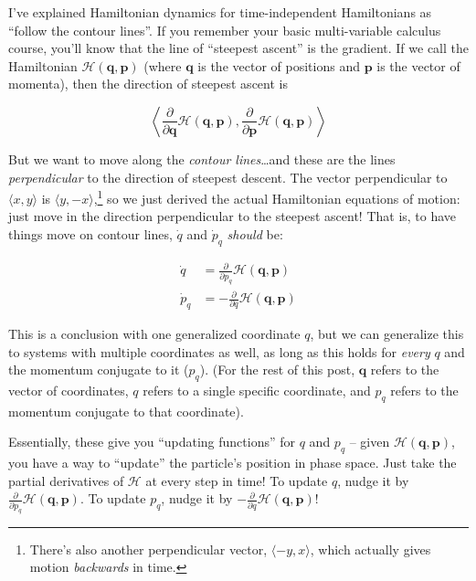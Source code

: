 \documentclass[]{article}
\begin{document}
I've explained Hamiltonian dynamics for time-independent Hamiltonians as
``follow the contour lines''. If you remember your basic multi-variable calculus
course, you'll know that the line of ``steepest ascent'' is the gradient. If we
call the Hamiltonian \(\mathcal{H}(\mathbf{q},\mathbf{p})\) (where
\(\mathbf{q}\) is the vector of positions and \(\mathbf{p}\) is the vector of
momenta), then the direction of steepest ascent is

\[
\left \langle \frac{\partial}{\partial \mathbf{q}}
\mathcal{H}(\mathbf{q},\mathbf{p}), \frac{\partial}{\partial \mathbf{p}}
\mathcal{H}(\mathbf{q},\mathbf{p}) \right \rangle
\]

But we want to move along the \emph{contour lines}\ldots and these are the lines
\emph{perpendicular} to the direction of steepest descent. The vector
perpendicular to \(\langle x, y \rangle\) is
\(\langle y, -x \rangle\),\footnote{There's also another perpendicular vector,
  \(\langle -y, x \rangle\), which actually gives motion \emph{backwards} in
  time.} so we just derived the actual Hamiltonian equations of motion: just
move in the direction perpendicular to the steepest ascent! That is, to have
things move on contour lines, \(\dot{q}\) and \(\dot{p}_q\) \emph{should} be:

\[
\begin{aligned}
\dot{q} & = \frac{\partial}{\partial p_q} \mathcal{H}(\mathbf{q},\mathbf{p}) \\
\dot{p}_q & = - \frac{\partial}{\partial q} \mathcal{H}(\mathbf{q},\mathbf{p})
\end{aligned}
\]

This is a conclusion with one generalized coordinate \(q\), but we can
generalize this to systems with multiple coordinates as well, as long as this
holds for \emph{every} \(q\) and the momentum conjugate to it (\(p_q\)). (For
the rest of this post, \(\mathbf{q}\) refers to the vector of coordinates, \(q\)
refers to a single specific coordinate, and \(p_q\) refers to the momentum
conjugate to that coordinate).

Essentially, these give you ``updating functions'' for \(q\) and \(p_q\) --
given \(\mathcal{H}(\mathbf{q},\mathbf{p})\), you have a way to ``update'' the
particle's position in phase space. Just take the partial derivatives of
\(\mathcal{H}\) at every step in time! To update \(q\), nudge it by
\(\frac{\partial}{\partial p_q}
\mathcal{H}(\mathbf{q},\mathbf{p})\). To update \(p_q\), nudge it by
\(-\frac{\partial}{\partial q} \mathcal{H}(\mathbf{q},\mathbf{p})\)!
\end{document}
